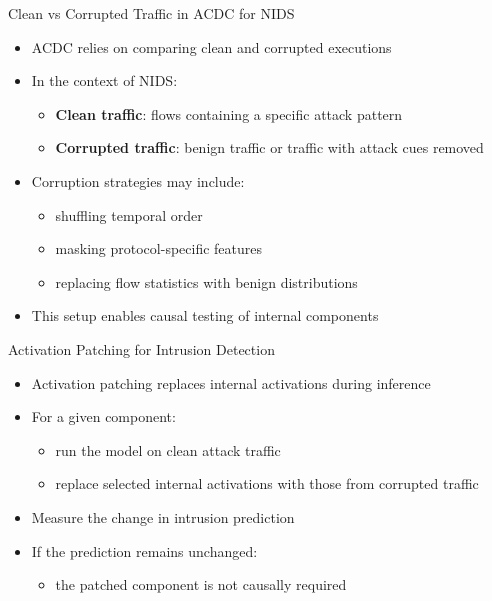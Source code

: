 \documentclass{beamer}
\begin{document}
	\begin{frame}{Clean vs Corrupted Traffic in ACDC for NIDS}
		\begin{itemize}
			\item ACDC relies on comparing clean and corrupted executions
			\item In the context of NIDS:
			\begin{itemize}
				\item \textbf{Clean traffic}: flows containing a specific attack pattern
				\item \textbf{Corrupted traffic}: benign traffic or traffic with attack cues removed
			\end{itemize}
			\item Corruption strategies may include:
			\begin{itemize}
				\item shuffling temporal order
				\item masking protocol-specific features
				\item replacing flow statistics with benign distributions
			\end{itemize}
			\item This setup enables causal testing of internal components
		\end{itemize}
	\end{frame}
	
	\begin{frame}{Activation Patching for Intrusion Detection}
		\begin{itemize}
			\item Activation patching replaces internal activations during inference
			\item For a given component:
			\begin{itemize}
				\item run the model on clean attack traffic
				\item replace selected internal activations with those from corrupted traffic
			\end{itemize}
			\item Measure the change in intrusion prediction
			\item If the prediction remains unchanged:
			\begin{itemize}
				\item the patched component is not causally required
			\end{itemize}
		\end{itemize}
	\end{frame}
	
\end{document}
